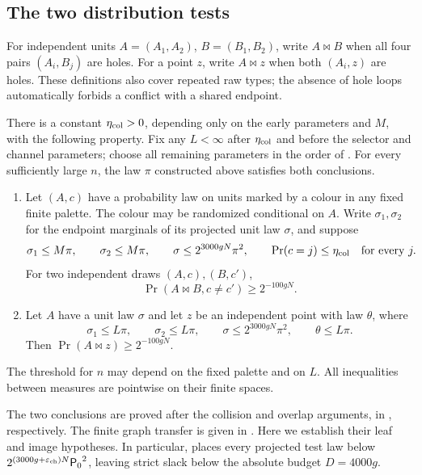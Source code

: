 \subsection{The two distribution tests}

For independent units \(A=(A_1,A_2)\), \(B=(B_1,B_2)\), write
\(A\bowtie B\) when all four pairs \((A_i,B_j)\) are holes.  For a point
\(z\), write \(A\bowtie z\) when both \((A_i,z)\) are holes.
These definitions also cover repeated raw types; the absence of hole
loops automatically forbids a conflict with a shared endpoint.

\begin{theorem}\label{thm:distribution-tests}
There is a constant \(\eta_{\rm col}>0\), depending only on the early
parameters and \(M\), with the following property.  Fix any \(L<\infty\)
after \(\eta_{\rm col}\) and before the selector and channel parameters;
choose all remaining parameters in the order of
.  For every sufficiently large
\(n\), the law \(\pi\) constructed above satisfies both conclusions.
\begin{enumerate}[label=\textup{(\roman*)}]
\item Let \((A,c)\) have a probability law on units marked by a colour in
any fixed finite palette.  The colour may be randomized conditional on
\(A\).  Write \(\sigma_1,\sigma_2\) for the endpoint
marginals of its projected unit law \(\sigma\), and suppose
\begin{equation}\label{eq:coloured-law-caps}
 \sigma_1\le M\pi,\qquad \sigma_2\le M\pi,\qquad
 \sigma\le2^{3000gN}\pi^2,
 \qquad \Pr(c=j)\le\eta_{\rm col}\quad\text{for every }j.
\end{equation}
For two independent draws \((A,c),(B,c')\),
\[
 \Pr(A\bowtie B, c\ne c')\ge2^{-100gN}.
\]
\item Let \(A\) have a unit law \(\sigma\) and let \(z\) be an independent
point with law \(\theta\), where
\begin{equation}\label{eq:asymmetric-law-caps}
 \sigma_1\le L\pi,\qquad \sigma_2\le L\pi,\qquad
 \sigma\le2^{3000gN}\pi^2,
 \qquad \theta\le L\pi.
\end{equation}
Then \(\Pr(A\bowtie z)\ge2^{-100gN}\).
\end{enumerate}
The threshold for \(n\) may depend on the fixed palette and on \(L\).
All inequalities between measures are pointwise on their finite spaces.
\end{theorem}

The two conclusions are proved after the collision and overlap arguments,
in , respectively.
The finite graph transfer is given in .
Here we establish their leaf and image hypotheses.  In particular,
 places every projected test law below
\(2^{(3000g+\varepsilon_{\rm ch})N}{\mathsf P_0}^2\), leaving strict slack
below the absolute budget \(D=4000g\).

